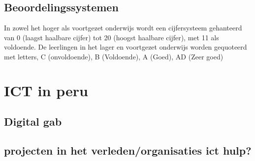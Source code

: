 \subsection{Beoordelingssystemen}
In zowel het hoger als voortgezet onderwijs wordt een cijfersysteem gehanteerd van 0 (laagst haalbare cijfer) tot 20 (hoogst haalbare cijfer), met 11 als voldoende.  De leerlingen in het lager en voortgezet onderwijs worden gequoteerd met letters, C (onvoldoende), B (Voldoende), A (Goed), AD (Zeer goed) \autocite{Nuffic2015}



\section{ICT in peru}
\subsection{Digital gab}
\subsection{projecten in het verleden/organisaties ict hulp?}

